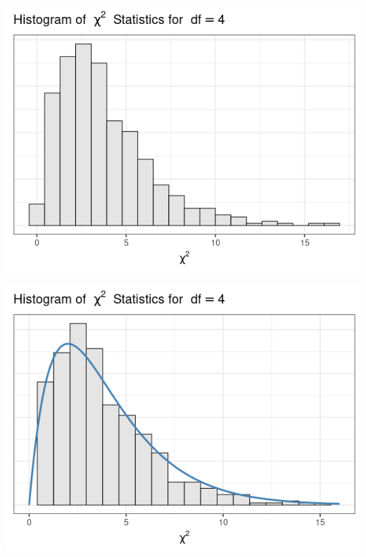 \documentclass{beamer}
\begin{document}
\begin{frame}
\begin{center}
\includegraphics[scale=0.5]{chisq_hist.png}
\end{center}
\end{frame}

\begin{frame}
\begin{center}
\includegraphics[scale=0.5]{chisq_hist2.png}
\end{center}
\end{frame}
\end{document}
